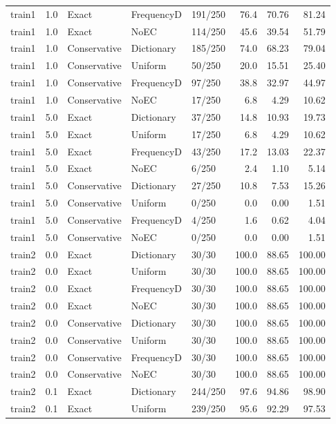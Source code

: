 \begin{longtable}{@{}lrlllrrr@{}}
train1 & 1.0 & Exact & FrequencyD & 191/250 & 76.4 & 70.76 & 81.24\\
train1 & 1.0 & Exact & NoEC & 114/250 & 45.6 & 39.54 & 51.79\\
train1 & 1.0 & Conservative & Dictionary & 185/250 & 74.0 & 68.23 & 79.04\\
train1 & 1.0 & Conservative & Uniform & 50/250 & 20.0 & 15.51 & 25.40\\
train1 & 1.0 & Conservative & FrequencyD & 97/250 & 38.8 & 32.97 & 44.97\\
train1 & 1.0 & Conservative & NoEC & 17/250 & 6.8 & 4.29 & 10.62\\
train1 & 5.0 & Exact & Dictionary & 37/250 & 14.8 & 10.93 & 19.73\\
train1 & 5.0 & Exact & Uniform & 17/250 & 6.8 & 4.29 & 10.62\\
train1 & 5.0 & Exact & FrequencyD & 43/250 & 17.2 & 13.03 & 22.37\\
train1 & 5.0 & Exact & NoEC & 6/250 & 2.4 & 1.10 & 5.14\\
train1 & 5.0 & Conservative & Dictionary & 27/250 & 10.8 & 7.53 & 15.26\\
train1 & 5.0 & Conservative & Uniform & 0/250 & 0.0 & 0.00 & 1.51\\
train1 & 5.0 & Conservative & FrequencyD & 4/250 & 1.6 & 0.62 & 4.04\\
train1 & 5.0 & Conservative & NoEC & 0/250 & 0.0 & 0.00 & 1.51\\
train2 & 0.0 & Exact & Dictionary & 30/30 & 100.0 & 88.65 & 100.00\\
train2 & 0.0 & Exact & Uniform & 30/30 & 100.0 & 88.65 & 100.00\\
train2 & 0.0 & Exact & FrequencyD & 30/30 & 100.0 & 88.65 & 100.00\\
train2 & 0.0 & Exact & NoEC & 30/30 & 100.0 & 88.65 & 100.00\\
train2 & 0.0 & Conservative & Dictionary & 30/30 & 100.0 & 88.65 & 100.00\\
train2 & 0.0 & Conservative & Uniform & 30/30 & 100.0 & 88.65 & 100.00\\
train2 & 0.0 & Conservative & FrequencyD & 30/30 & 100.0 & 88.65 & 100.00\\
train2 & 0.0 & Conservative & NoEC & 30/30 & 100.0 & 88.65 & 100.00\\
train2 & 0.1 & Exact & Dictionary & 244/250 & 97.6 & 94.86 & 98.90\\
train2 & 0.1 & Exact & Uniform & 239/250 & 95.6 & 92.29 & 97.53\\

\end{longtable}
